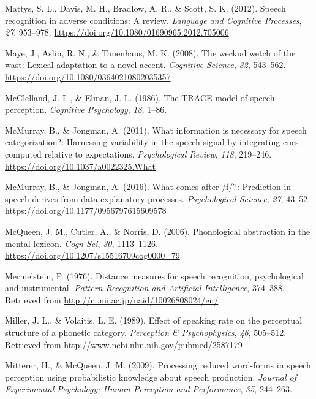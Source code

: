 \documentclass[
  11pt,
  man,floatsintext]{apa6}
\newlength{\cslhangindent}
\newlength{\cslentryspacingunit} %
\newenvironment{CSLReferences}[2] %
 {%
  \setlength{\parindent}{0pt}
  \ifodd #1
  \let\oldpar\par
  \def\par{\hangindent=\cslhangindent\oldpar}
  \fi
  \setlength{\parskip}{#2\cslentryspacingunit}
 }%
 {}
\begin{document}
\begin{CSLReferences}{1}{0}
\leavevmode{}%
Mattys, S. L., Davis, M. H., Bradlow, A. R., \& Scott, S. K. (2012). Speech recognition in adverse conditions: A review. \emph{Language and Cognitive Processes}, \emph{27}, 953--978. \url{https://doi.org/10.1080/01690965.2012.705006}

\leavevmode{}%
Maye, J., Aslin, R. N., \& Tanenhaus, M. K. (2008). The weckud wetch of the wast: Lexical adaptation to a novel accent. \emph{Cognitive Science}, \emph{32}, 543--562. \url{https://doi.org/10.1080/03640210802035357}

\leavevmode{}%
McClelland, J. L., \& Elman, J. L. (1986). The TRACE model of speech perception. \emph{Cognitive Psychology}, \emph{18}, 1--86.

\leavevmode{}%
McMurray, B., \& Jongman, A. (2011). What information is necessary for speech categorization?: Harnessing variability in the speech signal by integrating cues computed relative to expectations. \emph{Psychological Review}, \emph{118}, 219--246. \url{https://doi.org/10.1037/a0022325.What}

\leavevmode{}%
McMurray, B., \& Jongman, A. (2016). What comes after /f/?: Prediction in speech derives from data-explanatory processes. \emph{Psychological Science}, \emph{27}, 43--52. \url{https://doi.org/10.1177/0956797615609578}

\leavevmode{}%
McQueen, J. M., Cutler, A., \& Norris, D. (2006). Phonological abstraction in the mental lexicon. \emph{Cogn Sci}, \emph{30}, 1113--1126. \url{https://doi.org/10.1207/s15516709cog0000_79}

\leavevmode{}%
Mermelstein, P. (1976). Distance measures for speech recognition, psychological and instrumental. \emph{Pattern Recognition and Artificial Intelligence}, 374--388. Retrieved from \url{http://ci.nii.ac.jp/naid/10026808024/en/}

\leavevmode{}%
Miller, J. L., \& Volaitis, L. E. (1989). Effect of speaking rate on the perceptual structure of a phonetic category. \emph{Perception \& Psychophysics}, \emph{46}, 505--512. Retrieved from \url{http://www.ncbi.nlm.nih.gov/pubmed/2587179}

\leavevmode{}%
Mitterer, H., \& McQueen, J. M. (2009). Processing reduced word-forms in speech perception using probabilistic knowledge about speech production. \emph{Journal of Experimental Psychology: Human Perception and Performance}, \emph{35}, 244--263.


\end{CSLReferences}
\end{document}
